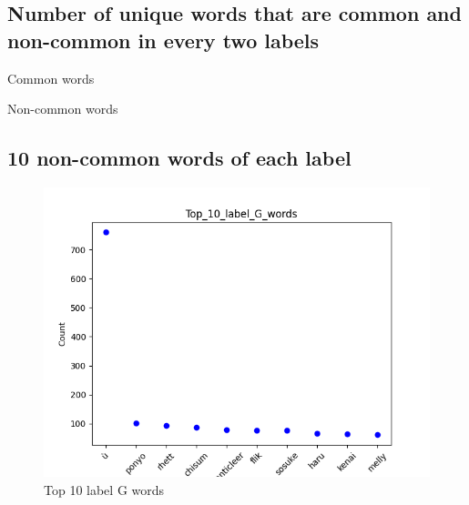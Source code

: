 \documentclass[a4paper]{article}
\begin{document}
\FloatBarrier

\subsection*{Number of unique words that are common and non-common in every two labels}

\begin{table}[ht]
    \centering
    \caption{Common words}
    \label{tab:common_words}
\end{table}

\begin{table}[ht]
    \centering

    \caption{Non-common words}
    \label{tab:non_common_words}
\end{table}

\FloatBarrier

\subsection*{10 non-common words of each label}

\begin{figure}[ht]
    \centering
    \includegraphics[width=1\textwidth]{../stats/Top_10_label_G_words.png}
    \caption{Top 10 label G words}
\end{figure}
\end{document}

